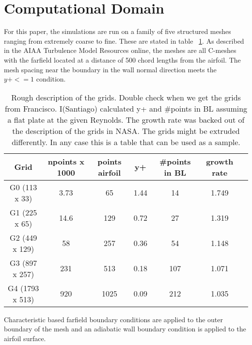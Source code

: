 

\section{Computational Domain}

For this paper, the simulations are run on a family of five structured meshes ranging from extremely coarse to fine. These are stated in table ~\ref{tab:naca0012_mesh}. As described in the AIAA Turbulence Model Resources online, the meshes are all C-meshes with the farfield located at a distance of 500 chord lengths from the airfoil.  The mesh spacing near the boundary in the wall normal direction meets the $y+<=1$ condition.

\begin{table}
  \centering
  \begin{tabular}{ccccccc} \\ \toprule
  Grid & npoints x 1000 & points airfoil & y+ & \#points in BL & growth rate  \\ \midrule
  G0 (113 x 33) & 3.73 & 65 & 1.44 & 14 & 1.749\\
  G1 (225 x 65) & 14.6 & 129 & 0.72 & 27 & 1.319\\
  G2 (449 x 129) & 58 & 257 & 0.36 & 54 & 1.148\\
  G3 (897 x 257) & 231 & 513 & 0.18 & 107 & 1.071\\
  G4 (1793 x 513) & 920 & 1025 & 0.09 & 212 & 1.035\\  \bottomrule
  \end{tabular}
  \caption{Rough description of the grids. Double check when we get the grids from Francisco.  I(Santiago) calculated y+ and \#points in BL assuming a flat plate at the given Reynolds. The growth rate was backed out of the description of the grids in NASA. The grids might be extruded differently. In any case this is a table that can be used as a sample.}
  \label{tab:naca0012_mesh}
\end{table}

Characteristic based farfield boundary conditions are applied to the outer boundary of the mesh and an adiabatic wall boundary condition is applied to the airfoil surface.